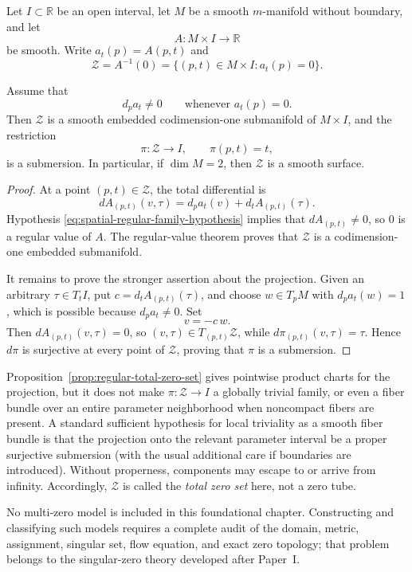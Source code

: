 Let \(I\subset\mathbb R\) be an open interval, let \(M\) be a smooth
\(m\)-manifold without boundary, and let
\[
 A:M\times I\longrightarrow\mathbb R
\]
be smooth.  Write \(a_t(p)=A(p,t)\) and
\[
 \mathcal Z=A^{-1}(0)
 =\{(p,t)\in M\times I:a_t(p)=0\}.
\]

\begin{proposition}\label{prop:regular-total-zero-set}
Assume that
\begin{equation}\label{eq:spatial-regular-family-hypothesis}
 d_pa_t\ne0
 \qquad\text{whenever }a_t(p)=0.
\end{equation}
Then \(\mathcal Z\) is a smooth embedded codimension-one submanifold of
\(M\times I\), and the restriction
\begin{equation}\label{eq:zero-family-projection}
 \pi:\mathcal Z\longrightarrow I,
 \qquad
 \pi(p,t)=t,
\end{equation}
is a submersion.  In particular, if \(\dim M=2\), then
\(\mathcal Z\) is a smooth surface.
\end{proposition}

\begin{proof}
At a point \((p,t)\in\mathcal Z\), the total differential is
\[
 dA_{(p,t)}(v,\tau)
 =d_pa_t(v)+d_tA_{(p,t)}(\tau).
\]
Hypothesis \eqref{eq:spatial-regular-family-hypothesis} implies that
\(dA_{(p,t)}\ne0\), so \(0\) is a regular value of \(A\).  The regular-value
theorem proves that \(\mathcal Z\) is a codimension-one embedded submanifold.

It remains to prove the stronger assertion about the projection.  Given an
arbitrary \(\tau\in T_tI\), put
\(c=d_tA_{(p,t)}(\tau)\), and choose \(w\in T_pM\) with
\(d_pa_t(w)=1\), which is possible because \(d_pa_t\ne0\).  Set
\[
 v=-c\,w.
\]
Then \(dA_{(p,t)}(v,\tau)=0\), so
\((v,\tau)\in T_{(p,t)}\mathcal Z\), while
\(d\pi_{(p,t)}(v,\tau)=\tau\).  Hence \(d\pi\) is surjective at every
point of \(\mathcal Z\), proving that \(\pi\) is a submersion.
\end{proof}

\begin{remark}\label{rem:zero-family-properness}
Proposition~\ref{prop:regular-total-zero-set} gives pointwise product charts
for the projection, but it does not make \(\pi:\mathcal Z\to I\) a globally
trivial family, or even a fiber bundle over an entire parameter neighborhood
when noncompact fibers are present.  A standard sufficient hypothesis for local
triviality as a smooth fiber bundle is that the projection onto the relevant
parameter interval be a proper surjective submersion (with the usual additional
care if boundaries are introduced).  Without properness, components may escape
to or arrive from infinity.  Accordingly, \(\mathcal Z\) is called the
\emph{total zero set} here, not a zero tube.
\end{remark}

No multi-zero model is included in this foundational chapter.  Constructing and
classifying such models requires a complete audit of the domain, metric,
assignment, singular set, flow equation, and exact zero topology; that problem
belongs to the singular-zero theory developed after Paper~I.
